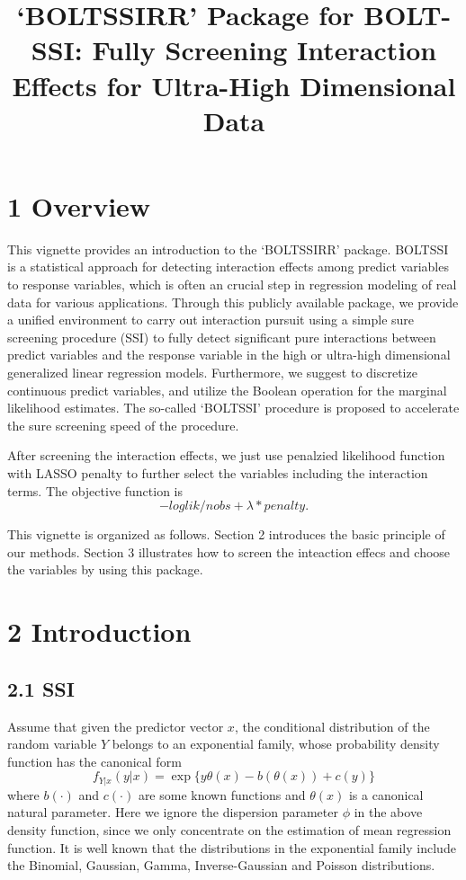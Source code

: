 \documentclass[]{article}
\title{`BOLTSSIRR' Package for BOLT-SSI: Fully Screening Interaction Effects
for Ultra-High Dimensional Data}
\author{}
\date{}
\begin{document}
\maketitle

\section{1 Overview}\label{overview}

This vignette provides an introduction to the `BOLTSSIRR' package.
BOLTSSI is a statistical approach for detecting interaction effects
among predict variables to response variables, which is often an crucial
step in regression modeling of real data for various applications.
Through this publicly available package, we provide a unified
environment to carry out interaction pursuit using a simple sure
screening procedure (SSI) to fully detect significant pure interactions
between predict variables and the response variable in the high or
ultra-high dimensional generalized linear regression models.
Furthermore, we suggest to discretize continuous predict variables, and
utilize the Boolean operation for the marginal likelihood estimates. The
so-called `BOLTSSI' procedure is proposed to accelerate the sure
screening speed of the procedure.

After screening the interaction effects, we just use penalzied
likelihood function with LASSO penalty to further select the variables
including the interaction terms. The objective function is
\[-loglik/nobs+\lambda*penalty.\]

This vignette is organized as follows. Section 2 introduces the basic
principle of our methods. Section 3 illustrates how to screen the
inteaction effecs and choose the variables by using this package.

\section{2 Introduction}\label{introduction}

\subsection{2.1 SSI}\label{ssi}

Assume that given the predictor vector \(x\), the conditional
distribution of the random variable \(Y\) belongs to an exponential
family, whose probability density function has the canonical form
\[f_{Y|x}(y|x)=\exp\{y\theta(x)-b(\theta(x))+c(y)\}\] where \(b(\cdot)\)
and \(c(\cdot)\) are some known functions and \(\theta(x)\) is a
canonical natural parameter. Here we ignore the dispersion parameter
\(\phi\) in the above density function, since we only concentrate on the
estimation of mean regression function. It is well known that the
distributions in the exponential family include the Binomial, Gaussian,
Gamma, Inverse-Gaussian and Poisson distributions.
\end{document}
